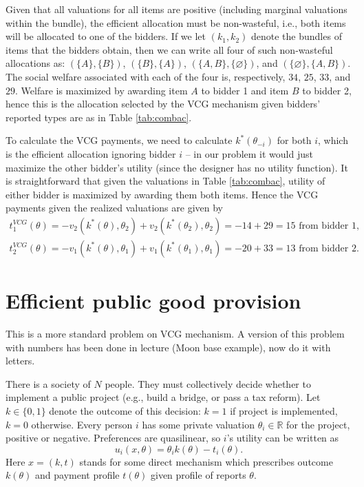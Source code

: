 \documentclass[a4paper]{article}
\begin{document}
	Given that all valuations for all items are positive (including marginal valuations within the bundle), the efficient allocation must be non-wasteful, i.e., both items will be allocated to one of the bidders. If we let $(k_1,k_2)$ denote the bundles of items that the bidders obtain, then we can write all four of such non-wasteful allocations as: $(\{A\},\{B\})$, $(\{B\},\{A\})$, $(\{A,B\},\{\varnothing\})$, and $(\{\varnothing\},\{A,B\})$. The social welfare associated with each of the four is, respectively, $34$, $25$, $33$, and $29$. Welfare is maximized by awarding item $A$ to bidder 1 and item $B$ to bidder 2, hence this is the allocation selected by the VCG mechanism given bidders' reported types are as in Table \ref{tab:combac}.
	
	To calculate the VCG payments, we need to calculate $k^*(\theta_{-i})$ for both $i$, which is the efficient allocation ignoring bidder $i$ -- in our problem it would just maximize the other bidder's utility (since the designer has no utility function). It is straightforward that given the valuations in Table \ref{tab:combac}, utility of either bidder is maximized by awarding them both items. Hence the VCG payments given the realized valuations are given by
	\begin{align*}
		t_1^{VCG}(\theta) = -v_2(k^*(\theta),\theta_2) + v_2(k^*(\theta_2),\theta_2) = -14+29 = 15 \text{ from bidder 1,}
		\\
		t_2^{VCG}(\theta) = -v_1(k^*(\theta),\theta_1) + v_1(k^*(\theta_1),\theta_1) = -20+33 = 13 \text{ from bidder 2.}
	\end{align*}
\fi 



\section{Efficient public good provision}
	
	This is a more standard problem on VCG mechanism. A version of this problem with numbers has been done in lecture (Moon base example), now do it with letters.
	
	There is a society of $N$ people. They must collectively decide whether to implement a public project (e.g., build a bridge, or pass a tax reform). Let $k \in \{0,1\}$ denote the outcome of this decision: $k=1$ if project is implemented, $k=0$ otherwise. Every person $i$ has some private valuation $\theta_i \in \mathbb{R}$ for the project, positive or negative. Preferences are quasilinear, so $i$'s utility can be written as
	$$
		u_i(x,\theta) = \theta_i k(\theta) - t_i(\theta).
	$$
	Here $x=(k,t)$ stands for some direct mechanism which prescribes outcome $k(\theta)$ and payment profile $t(\theta)$ given profile of reports $\theta$.
	
\end{document}
